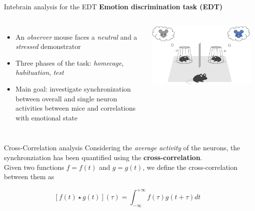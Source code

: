\documentclass{beamer}
\begin{document}
\begin{frame}{Intebrain analysis for the EDT}
\textbf{Emotion discrimination task (EDT)}

\begin{columns}
	\begin{itemize}
		\vspace{0.5cm}
		\item An \textit{observer} mouse faces a \textit{neutral} and a \textit{stressed} demonstrator 
		
	
		\item Three phases of the task: \textit{homecage}, \textit{habituation}, \textit{test}
		
		
		\item Main goal: investigate synchronization between overall and single neuron activities between mice and correlations with emotional state
		
		
	\end{itemize}
	\centering
	\includegraphics[scale=0.35]{emotion_discrimination}
	
\end{columns}

\end{frame}

\begin{frame}{Cross-Correlation analysis}
Considering the \textit{average activity} of the neurons, the synchronziation has been quantified using the \textbf{cross-correlation}.\\ Given two functions $ f = f(t)$ and $ g = g(t)$, we define the cross-correlation between them as

\vspace{1 cm}
$$
[f(t) \star g(t)] (\tau) = \int_{-\infty}^{+\infty} f(\tau)g(t+\tau) dt$$ \label{cc_def}


\end{frame}
\end{document}
